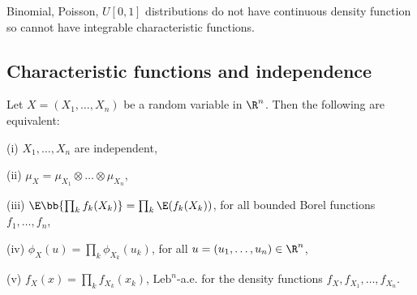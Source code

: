 \begin{remark}
Binomial, Poisson, $U[0,1]$ distributions do not have continuous density function so cannot have integrable characteristic functions.
\end{remark}


\subsection{Characteristic functions and independence}

\begin{theorem}\label{thm:characteristic_function_independence}%
Let $X = (X_1, \dots,X_n)$ be a random variable in $\R^n$. Then the following are equivalent:
\ben
\item [(i)] $X_1, \dots,X_n$ are independent,
\item [(ii)] $\mu_X = \mu_{X_1} \otimes\dots \otimes \mu_{X_n}$,
\item [(iii)] $\E\bb{\prod_k f_k(X_k)} = \prod_k \E(f_k(X_k))$, for all bounded Borel functions $f_1,\dots, f_n$,
\item [(iv)] $\phi_X(u) = \prod_k \phi_{X_k}(u_k)$, for all $u = (u_1, \dots, u_n) \in \R^n$,
\item [(v)] $f_X(x) = \prod_k f_{X_k}(x_k)$, $\text{Leb}^n$-a.e. for the density functions $f_X,f_{X_1},\dots,f_{X_n}$.
\een
\end{theorem}
